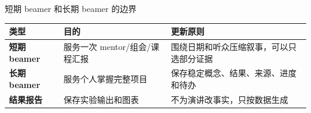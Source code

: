 \begin{frame}{短期 beamer 和长期 beamer 的边界}
\vspace{4pt}
\begin{center}
\begin{tabularx}{\textwidth}{>{\bfseries}lXX}
\toprule
类型 & 目的 & 更新原则 \\
\midrule
短期 beamer & 服务一次 mentor/组会/课程汇报 & 围绕日期和听众压缩叙事，可以只选部分证据 \\
长期 beamer & 服务个人掌握完整项目 & 保存稳定概念、结果、来源、进度和待办 \\
结果报告 & 保存实验输出和图表 & 不为演讲改事实，只按数据生成 \\
\bottomrule
\end{tabularx}
\end{center}
\end{frame}
